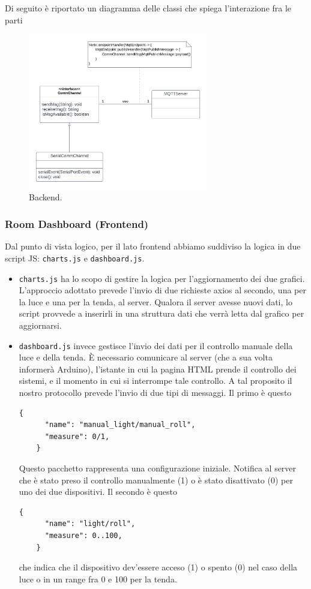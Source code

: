 \documentclass[a4paper,12pt]{report}
\begin{document}
Di seguito è riportato un diagramma delle classi che spiega l'interazione fra le parti
\begin{figure}[H]
    \centering
    \includegraphics[width=0.7\textwidth]{img/Classi - backend.png}
    \caption{Backend.}
    \label{fig:backend}
\end{figure}

\subsubsection{Room Dashboard (Frontend)}
Dal punto di vista logico, per il lato frontend abbiamo suddiviso la logica in due script JS: \texttt{charts.js} e \texttt{dashboard.js}.
\begin{itemize}
    \item \texttt{charts.js} ha lo scopo di gestire la logica per l'aggiornamento dei due grafici. L'approccio adottato prevede l'invio di due richieste axios al secondo, una per la luce e una per la tenda, al server. Qualora il server avesse nuovi dati, lo script provvede a inserirli in una struttura dati che verrà letta dal grafico per aggiornarsi.
    \item \texttt{dashboard.js} invece gestisce l'invio dei dati per il controllo manuale della luce e della tenda. È necessario comunicare al server (che a sua volta informerà Arduino), l'istante in cui la pagina HTML prende il controllo dei sistemi, e il momento in cui si interrompe tale controllo. A tal proposito il nostro protocollo prevede l'invio di due tipi di messaggi.
    Il primo è questo
    \begin{lstlisting}[style=json]
    {
      "name": "manual_light/manual_roll",
      "measure": 0/1,
    }
    \end{lstlisting}
    Questo pacchetto rappresenta una configurazione iniziale. Notifica al server che è stato preso il controllo manualmente (1) o è stato disattivato (0) per uno dei due dispositivi.
    Il secondo è questo
    \begin{lstlisting}[style=json]
    {
      "name": "light/roll",
      "measure": 0..100,
    }
    \end{lstlisting}
    che indica che il dispositivo dev'essere acceso (1) o spento (0) nel caso della luce o in un range fra 0 e 100 per la tenda. 
\end{itemize}
\end{document}
